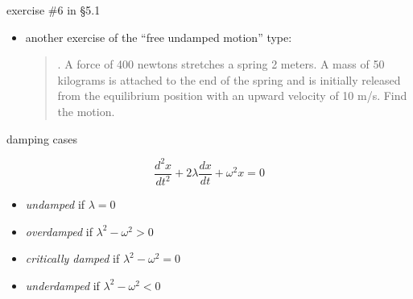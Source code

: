 \documentclass{beamer}
\begin{document}
\begin{frame}{exercise \#6 in \S5.1}

\begin{itemize}
\item another exercise of the ``free undamped motion'' type:

\begin{quotation}
. A force of 400 newtons stretches a spring 2 meters.  A mass of 50 kilograms is attached to the end of the spring and is initially released from the equilibrium position with an upward velocity of 10 m/s.  Find the motion.
\end{quotation}
\end{itemize}

\vspace{40mm}
\end{frame}




\begin{frame}{damping cases}

$$\frac{d^2x}{dt^2} + 2 \lambda \frac{dx}{dt} + \omega^2 x=0$$

\begin{itemize}
\item \emph{undamped} if $\lambda = 0$
\item \emph{overdamped} if $\lambda^2-\omega^2 > 0$
\item \emph{critically damped} if $\lambda^2-\omega^2 = 0$
\item \emph{underdamped} if $\lambda^2-\omega^2 < 0$
\end{itemize}
\end{frame}
\end{document}
